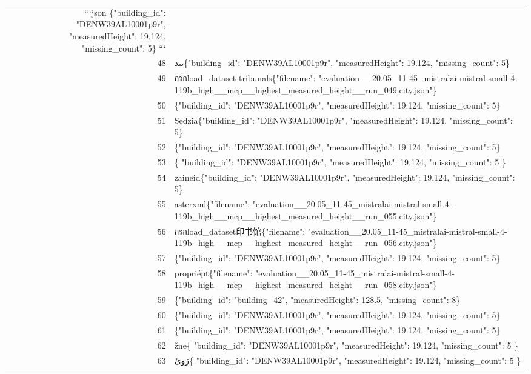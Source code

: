 \documentclass[a4paper,11pt]{article}
\begin{document}
\begin{table}[ht]
\begin{tabular}{r p{12cm}}
```json
\{"building\_id": "DENW39AL10001p9r", "measuredHeight": 19.124, "missing\_count": 5\}
``` \\
48 & یید\{"building\_id": "DENW39AL10001p9r", "measuredHeight": 19.124, "missing\_count": 5\} \\
49 &  กรกload\_dataset tribunals\{"filename": "evaluation\_\_20.05\_11-45\_mistralai-mistral-small-4-119b\_high\_\_mcp\_\_highest\_measured\_height\_\_run\_049.city.json"\} \\
50 & \{"building\_id": "DENW39AL10001p9r", "measuredHeight": 19.124, "missing\_count": 5\} \\
51 & Sędzia\{"building\_id": "DENW39AL10001p9r", "measuredHeight": 19.124, "missing\_count": 5\} \\
52 & \{"building\_id": "DENW39AL10001p9r", "measuredHeight": 19.124, "missing\_count": 5\} \\
53 & \{
  "building\_id": "DENW39AL10001p9r",
  "measuredHeight": 19.124,
  "missing\_count": 5
\} \\
54 & zaineid\{"building\_id": "DENW39AL10001p9r", "measuredHeight": 19.124, "missing\_count": 5\} \\
55 & asterxml\{"filename": "evaluation\_\_20.05\_11-45\_mistralai-mistral-small-4-119b\_high\_\_mcp\_\_highest\_measured\_height\_\_run\_055.city.json"\} \\
56 &  กรกload\_dataset印书馆\{"filename": "evaluation\_\_20.05\_11-45\_mistralai-mistral-small-4-119b\_high\_\_mcp\_\_highest\_measured\_height\_\_run\_056.city.json"\} \\
57 & \{"building\_id": "DENW39AL10001p9r", "measuredHeight": 19.124, "missing\_count": 5\} \\
58 &  propriépt\{"filename": "evaluation\_\_20.05\_11-45\_mistralai-mistral-small-4-119b\_high\_\_mcp\_\_highest\_measured\_height\_\_run\_058.city.json"\} \\
59 & \{"building\_id": "building\_42", "measuredHeight": 128.5, "missing\_count": 8\} \\
60 & \{"building\_id": "DENW39AL10001p9r", "measuredHeight": 19.124, "missing\_count": 5\} \\
61 & \{"building\_id": "DENW39AL10001p9r", "measuredHeight": 19.124, "missing\_count": 5\} \\
62 & žne\{
  "building\_id": "DENW39AL10001p9r",
  "measuredHeight": 19.124,
  "missing\_count": 5
\} \\
63 &  ژوئ\{
  "building\_id": "DENW39AL10001p9r",
  "measuredHeight": 19.124,
  "missing\_count": 5
\} \\

\end{tabular}
\end{table}
\end{document}
